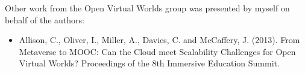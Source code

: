 
Other work from the Open Virtual Worlds group was presented by myself on behalf of the authors:

\begin{itemize}
	
	\item Allison, C., Oliver, I., Miller, A., Davies, C. and McCaffery, J. (2013). From Metaverse to MOOC: Can the Cloud meet Scalability Challenges for Open Virtual Worlds? Proceedings of the 8th Immersive Education Summit.
	
\end{itemize}

